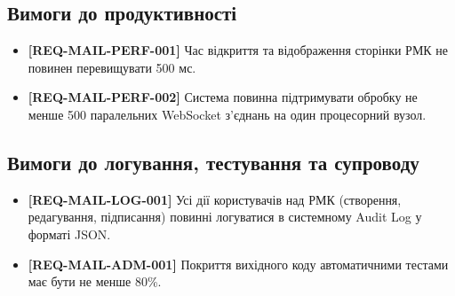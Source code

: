 \documentclass{article}
\begin{document}
\subsection{Вимоги до продуктивності}
\begin{itemize}
    \item \textbf{[REQ-MAIL-PERF-001]} Час відкриття та відображення сторінки РМК не повинен перевищувати 500 мс.
    \item \textbf{[REQ-MAIL-PERF-002]} Система повинна підтримувати обробку не менше 500 паралельних WebSocket з'єднань на один процесорний вузол.
\end{itemize}

\subsection{Вимоги до логування, тестування та супроводу}
\begin{itemize}
    \item \textbf{[REQ-MAIL-LOG-001]} Усі дії користувачів над РМК (створення, редагування, підписання) повинні логуватися в системному Audit Log у форматі JSON.
    \item \textbf{[REQ-MAIL-ADM-001]} Покриття вихідного коду автоматичними тестами має бути не менше 80\%.
\end{itemize}
\end{document}
